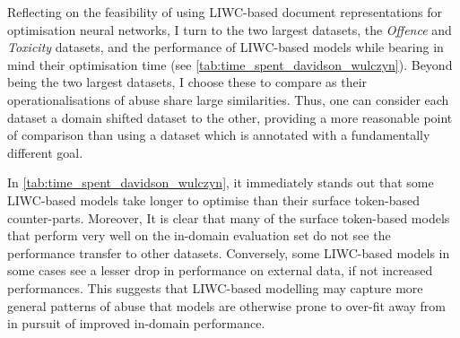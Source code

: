 Reflecting on the feasibility of using LIWC-based document representations for optimisation neural networks, I turn to the two largest datasets, the \textit{Offence} and \textit{Toxicity} datasets, and the performance of LIWC-based models while bearing in mind their optimisation time (see \cref{tab:time_spent_davidson_wulczyn}).
Beyond being the two largest datasets, I choose these to compare as their operationalisations of abuse share large similarities. 
Thus, one can consider each dataset a domain shifted dataset to the other, providing a more reasonable point of comparison than using a dataset which is annotated with a fundamentally different goal.

In \cref{tab:time_spent_davidson_wulczyn}, it immediately stands out that some LIWC-based models take longer to optimise than their surface token-based counter-parts.
Moreover, It is clear that many of the surface token-based models that perform very well on the in-domain evaluation set do not see the performance transfer to other datasets.
Conversely, some LIWC-based models in some cases see a lesser drop in performance on external data, if not increased performances.
This suggests that LIWC-based modelling may capture more general patterns of abuse that models are otherwise prone to over-fit away from in pursuit of improved in-domain performance.


